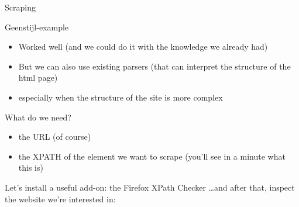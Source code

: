 \documentclass{beamer}
\begin{document}
\begin{frame}{Scraping}
\begin{block}{Geenstijl-example}
\begin{itemize}
\item<1->Worked well (and we could do it with the knowledge we already had)
\item<2->But we can also use existing parsers (that can interpret the structure of the html page)
\item<3->especially when the structure of the site is more complex 
\end{itemize}
\end{block}
\footnotesize{
}
\end{frame}




\begin{frame}{What do we need?}
\begin{itemize}
\item the URL (of course)
\item the XPATH of the element we want to scrape (you'll see in a minute what this is)
\end{itemize}
\end{frame}



\begin{frame}{Let's install a useful add-on: the Firefox XPath Checker}
\large \ldots and after that, inspect the website we're interested in:
\end{frame}
\end{document}
